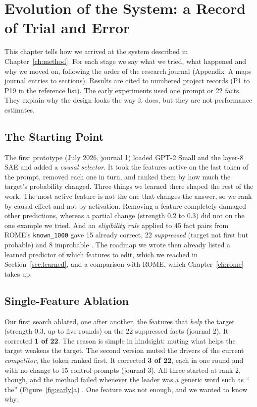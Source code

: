 \chapter{Evolution of the System: a Record of Trial and Error}\label{ch:evolution}

This chapter tells how we arrived at the system described in Chapter~\ref{ch:method}. For each stage we say what we tried, what happened and why we moved on, following the order of the research journal (Appendix~A maps journal entries to sections). Results are cited to numbered project records (P1 to P19 in the reference list). The early experiments used one prompt or 22 facts. They explain why the design looks the way it does, but they are not performance estimates.

\section{The Starting Point}\label{sec:start}

The first prototype (July 2026, journal 1) loaded GPT-2 Small and the layer-8 SAE and added a \emph{causal selector}. It took the features active on the last token of the prompt, removed each one in turn, and ranked them by how much the target's probability changed. Three things we learned there shaped the rest of the work. The most active feature is not the one that changes the answer, so we rank by causal effect and not by activation. Removing a feature completely damaged other predictions, whereas a partial change (strength 0.2 to 0.3) did not on the one example we tried. And an \emph{eligibility rule} applied to 45 fact pairs from ROME's \texttt{known\_1000} gave 15 already correct, 22 \emph{suppressed} (target not first but probable) and 8 improbable \cite{r2,p1}. The roadmap we wrote then already listed a learned predictor of which features to edit, which we reached in Section~\ref{sec:learned}, and a comparison with ROME, which Chapter~\ref{ch:rome} takes up.

\section{Single-Feature Ablation}\label{sec:ablation}

Our first search ablated, one after another, the features that \emph{help} the target (strength 0.3, up to five rounds) on the 22 suppressed facts (journal 2). It corrected \textbf{1 of 22}. The reason is simple in hindsight: muting what helps the target weakens the target. The second version muted the drivers of the current \emph{competitor}, the token ranked first. It corrected \textbf{3 of 22}, each in one round and with no change to 15 control prompts (journal 3). All three started at rank 2, though, and the method failed whenever the leader was a generic word such as `` the'' (Figure~\ref{fig:early}a) \cite{p2}. One feature was not enough, and we wanted to know why.

